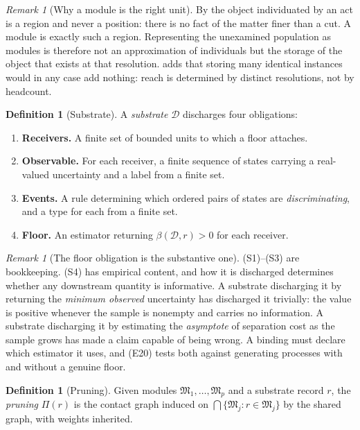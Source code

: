 \documentclass[11pt,a4paper]{article}
\theoremstyle{clstyle}
\theoremstyle{definition}
\newtheorem{definition}[theorem]{Definition}
\theoremstyle{remark}
\newtheorem{remark}[theorem]{Remark}
\newcommand{\flo}{\beta}
\newcommand{\Mod}{\mathfrak{M}}
\begin{document}
\begin{remark}[Why a module is the right unit]
\label{rem:module-right}
By  the object individuated by an act is a region and
never a position: there is no fact of the matter finer than a cut. A module
is exactly such a region. Representing the unexamined population as modules
is therefore not an approximation of individuals but the storage of the
object that exists at that resolution.  adds that
storing many identical instances would in any case add nothing: reach is
determined by distinct resolutions, not by headcount.
\end{remark}

\begin{definition}[Substrate]
\label{def:substrate}
A \emph{substrate} $\mathcal{D}$ discharges four obligations:
\begin{enumerate}[label=\textup{(S\arabic*)},leftmargin=3.2em,nosep]
\item \textbf{Receivers.} A finite set of bounded units to which a floor
attaches.
\item \textbf{Observable.} For each receiver, a finite sequence of states
carrying a real-valued uncertainty and a label from a finite set.
\item \textbf{Events.} A rule determining which ordered pairs of states are
\emph{discriminating}, and a type for each from a finite set.
\item \textbf{Floor.} An estimator returning $\flo(\mathcal{D},r)>0$ for each
receiver.
\end{enumerate}
\end{definition}

\begin{remark}[The floor obligation is the substantive one]
\label{rem:floor-obligation}
(S1)--(S3) are bookkeeping. (S4) has empirical content, and how it is
discharged determines whether any downstream quantity is informative. A
substrate discharging it by returning the \emph{minimum observed}
uncertainty has discharged it trivially: the value is positive whenever the
sample is nonempty and carries no information. A substrate discharging it by
estimating the \emph{asymptote} of separation cost as the sample grows has
made a claim capable of being wrong. A binding must declare which estimator
it uses, and  (E20) tests both against generating
processes with and without a genuine floor.
\end{remark}

\begin{definition}[Pruning]
\label{def:prune}
Given modules $\Mod_1,\dots,\Mod_p$ and a substrate record $r$, the
\emph{pruning} $\Pi(r)$ is the contact graph induced on
$\bigcap\{\Mod_j : r\in\Mod_j\}$ by the shared graph, with weights inherited.
\end{definition}
\end{document}
